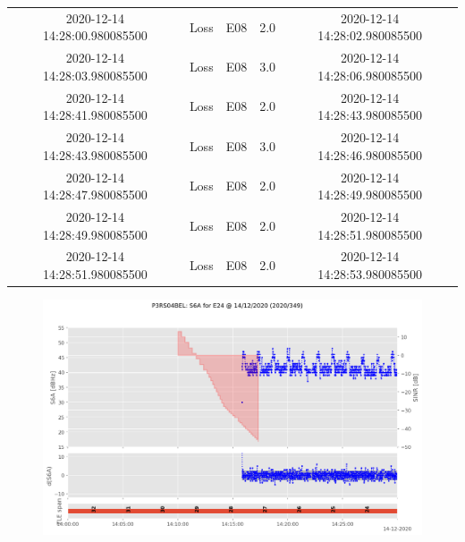 \begin{enumerate}
\begin{longtabu}{ccccc}
2020{-}12{-}14 14:28:00.980085500&Loss&E08&2.0&2020{-}12{-}14 14:28:02.980085500\\%
2020{-}12{-}14 14:28:03.980085500&Loss&E08&3.0&2020{-}12{-}14 14:28:06.980085500\\%
2020{-}12{-}14 14:28:41.980085500&Loss&E08&2.0&2020{-}12{-}14 14:28:43.980085500\\%
2020{-}12{-}14 14:28:43.980085500&Loss&E08&3.0&2020{-}12{-}14 14:28:46.980085500\\%
2020{-}12{-}14 14:28:47.980085500&Loss&E08&2.0&2020{-}12{-}14 14:28:49.980085500\\%
2020{-}12{-}14 14:28:49.980085500&Loss&E08&2.0&2020{-}12{-}14 14:28:51.980085500\\%
2020{-}12{-}14 14:28:51.980085500&Loss&E08&2.0&2020{-}12{-}14 14:28:53.980085500\\%
\hline%
\end{longtabu}%


\begin{figure}[H]%
\centering%
\includegraphics[width=0.95\linewidth]{png/P3RS04BEL_R_20203490000_01D_00U_MO_E-S6A-E24.png}%
\end{figure}


\end{enumerate}
